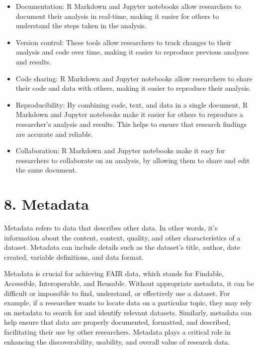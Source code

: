 \documentclass[
  letterpaper,
  DIV=11,
  numbers=noendperiod]{scrreprt}
\begin{document}
\begin{itemize}
\item
  Documentation: R Markdown and Jupyter notebooks allow researchers to
  document their analysis in real-time, making it easier for others to
  understand the steps taken in the analysis.
\item
  Version control: These tools allow researchers to track changes to
  their analysis and code over time, making it easier to reproduce
  previous analyses and results.
\item
  Code sharing: R Markdown and Jupyter notebooks allow researchers to
  share their code and data with others, making it easier to reproduce
  their analysis.
\item
  Reproducibility: By combining code, text, and data in a single
  document, R Markdown and Jupyter notebooks make it easier for others
  to reproduce a researcher's analysis and results. This helps to ensure
  that research findings are accurate and reliable.
\item
  Collaboration: R Markdown and Jupyter notebooks make it easy for
  researchers to collaborate on an analysis, by allowing them to share
  and edit the same document.
\end{itemize}


\hypertarget{metadata-1}{%
\chapter*{8. Metadata}\label{metadata-1}}


Metadata refers to data that describes other data. In other words, it's
information about the content, context, quality, and other
characteristics of a dataset. Metadata can include details such as the
dataset's title, author, date created, variable definitions, and data
format.

Metadata is crucial for achieving FAIR data, which stands for Findable,
Accessible, Interoperable, and Reusable. Without appropriate metadata,
it can be difficult or impossible to find, understand, or effectively
use a dataset. For example, if a researcher wants to locate data on a
particular topic, they may rely on metadata to search for and identify
relevant datasets. Similarly, metadata can help ensure that data are
properly documented, formatted, and described, facilitating their use by
other researchers. Metadata plays a critical role in enhancing the
discoverability, usability, and overall value of research data.
\end{document}
